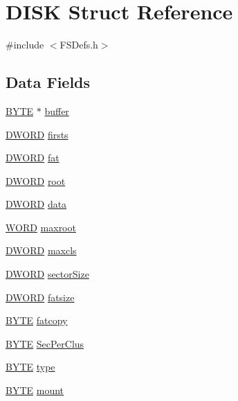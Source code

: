 \hypertarget{struct_d_i_s_k}{}\section{D\+I\+S\+K Struct Reference}
\label{struct_d_i_s_k}


{\ttfamily \#include $<$F\+S\+Defs.\+h$>$}

\subsection*{Data Fields}
\begin{DoxyCompactItemize}
\item 
\hyperlink{_generic_type_defs_8h_a4ae1dab0fb4b072a66584546209e7d58}{B\+Y\+T\+E} $\ast$ \hyperlink{struct_d_i_s_k_a4ec488d25cd057a45ada6fd7c83de21b}{buffer}
\item 
\hyperlink{_generic_type_defs_8h_ad342ac907eb044443153a22f964bf0af}{D\+W\+O\+R\+D} \hyperlink{struct_d_i_s_k_a06ecec885cf3c8cfdcf1125d17958432}{firsts}
\item 
\hyperlink{_generic_type_defs_8h_ad342ac907eb044443153a22f964bf0af}{D\+W\+O\+R\+D} \hyperlink{struct_d_i_s_k_a7b898a474462813d546af9cf8392199e}{fat}
\item 
\hyperlink{_generic_type_defs_8h_ad342ac907eb044443153a22f964bf0af}{D\+W\+O\+R\+D} \hyperlink{struct_d_i_s_k_ad1dbc97d66e5ae1004b8e1b85bd3530a}{root}
\item 
\hyperlink{_generic_type_defs_8h_ad342ac907eb044443153a22f964bf0af}{D\+W\+O\+R\+D} \hyperlink{struct_d_i_s_k_a93725455c265ad9e4e156050f329ee97}{data}
\item 
\hyperlink{_generic_type_defs_8h_a2b0e863dadf920709ec53d9088ee7c91}{W\+O\+R\+D} \hyperlink{struct_d_i_s_k_a253064a74611d30875379e54f97c1950}{maxroot}
\item 
\hyperlink{_generic_type_defs_8h_ad342ac907eb044443153a22f964bf0af}{D\+W\+O\+R\+D} \hyperlink{struct_d_i_s_k_a333cc1dd1174def8af56d4c03e97d537}{maxcls}
\item 
\hyperlink{_generic_type_defs_8h_ad342ac907eb044443153a22f964bf0af}{D\+W\+O\+R\+D} \hyperlink{struct_d_i_s_k_a1cde99d3fb7daeacb3c397df7fe91cbc}{sector\+Size}
\item 
\hyperlink{_generic_type_defs_8h_ad342ac907eb044443153a22f964bf0af}{D\+W\+O\+R\+D} \hyperlink{struct_d_i_s_k_a11e569ece9ab2d324e773426da5c0bfe}{fatsize}
\item 
\hyperlink{_generic_type_defs_8h_a4ae1dab0fb4b072a66584546209e7d58}{B\+Y\+T\+E} \hyperlink{struct_d_i_s_k_ac037845172a33a3fc49137ebaae57c4e}{fatcopy}
\item 
\hyperlink{_generic_type_defs_8h_a4ae1dab0fb4b072a66584546209e7d58}{B\+Y\+T\+E} \hyperlink{struct_d_i_s_k_a1f0f19ff97474a54f8efe3eb6a9d8111}{Sec\+Per\+Clus}
\item 
\hyperlink{_generic_type_defs_8h_a4ae1dab0fb4b072a66584546209e7d58}{B\+Y\+T\+E} \hyperlink{struct_d_i_s_k_aab7cf12125f16245546ef7411994ebb9}{type}
\item 
\hyperlink{_generic_type_defs_8h_a4ae1dab0fb4b072a66584546209e7d58}{B\+Y\+T\+E} \hyperlink{struct_d_i_s_k_aaff6041e51154e6e228bbaba9d97a296}{mount}
\end{DoxyCompactItemize}


